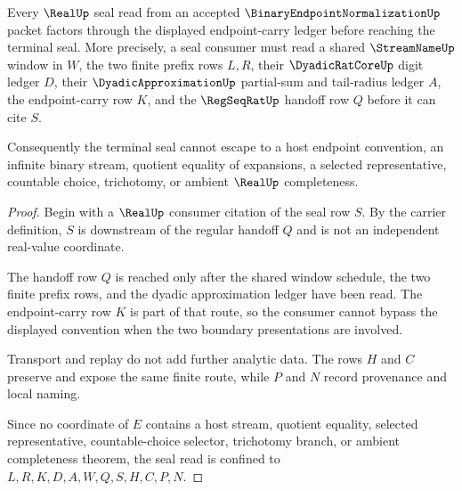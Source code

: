 \begin{theorem}
\label{thm:binary-endpoint-normalization-real-seal-nonescape}
Every $\RealUp$ seal read from an accepted $\BinaryEndpointNormalizationUp$ packet factors through the displayed endpoint-carry ledger before reaching the terminal seal. More precisely, a seal consumer must read a shared $\StreamNameUp$ window in $W$, the two finite prefix rows $L,R$, their $\DyadicRatCoreUp$ digit ledger $D$, their $\DyadicApproximationUp$ partial-sum and tail-radius ledger $A$, the endpoint-carry row $K$, and the $\RegSeqRatUp$ handoff row $Q$ before it can cite $S$.

Consequently the terminal seal cannot escape to a host endpoint convention, an infinite binary stream, quotient equality of expansions, a selected representative, countable choice, trichotomy, or ambient $\RealUp$ completeness.
\end{theorem}
\begin{proof}
Begin with a $\RealUp$ consumer citation of the seal row $S$. By the carrier definition, $S$ is downstream of the regular handoff $Q$ and is not an independent real-value coordinate.

The handoff row $Q$ is reached only after the shared window schedule, the two finite prefix rows, and the dyadic approximation ledger have been read. The endpoint-carry row $K$ is part of that route, so the consumer cannot bypass the displayed convention when the two boundary presentations are involved.

Transport and replay do not add further analytic data. The rows $H$ and $C$ preserve and expose the same finite route, while $P$ and $N$ record provenance and local naming.

Since no coordinate of $E$ contains a host stream, quotient equality, selected representative, countable-choice selector, trichotomy branch, or ambient completeness theorem, the seal read is confined to $L,R,K,D,A,W,Q,S,H,C,P,N$.
\end{proof}

